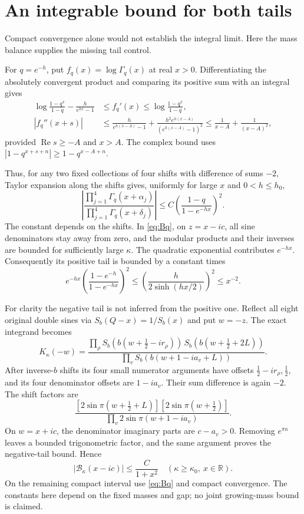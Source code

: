 \documentclass[11pt,a4paper]{article}
\begin{document}
\section{An integrable bound for both tails}
Compact convergence alone would not establish the integral limit.
Here the mass balance supplies the missing tail control.

For \(q=e^{-h}\), put \(f_q(x)=\log\Gamma_q(x)\) at real \(x>0\).
Differentiating the absolutely convergent product and comparing its
positive sum with an integral gives
\begin{align}
 \log\frac{1-q^x}{1-q}-\frac{h}{e^{hx}-1}
 &\le f_q'(x)\le\log\frac{1-q^x}{1-q},\\
 |f_q''(x+s)|
 &\le \frac{h}{e^{h(x-A)}-1}
       +\frac{h^2e^{h(x-A)}}{(e^{h(x-A)}-1)^2}
 \le\frac1{x-A}+\frac1{(x-A)^2},
 \label{eq:qbounds}
\end{align}
provided \(\operatorname{Re}s\ge-A\) and \(x>A\). The complex bound
uses \(|1-q^{x+s+n}|\ge1-q^{x-A+n}\).

Thus, for any two fixed collections of four shifts with difference of
sums \(-2\), Taylor expansion along the shifts gives, uniformly for
large \(x\) and \(0<h\le h_0\),
\begin{equation}
 \left|\frac{\prod_{j=1}^4\Gamma_q(x+\alpha_j)}
                  {\prod_{j=1}^4\Gamma_q(x+\delta_j)}\right|
 \le C\left(\frac{1-q}{1-e^{-hx}}\right)^2. \label{eq:qratio}
\end{equation}
The constant depends on the shifts. In \eqref{eq:Bq}, on
\(z=x-ic\), all sine denominators stay away from zero, and the modular
products and their inverses are bounded for sufficiently large
\(\kappa\). The quadratic exponential contributes \(e^{-hx}\).
Consequently its positive tail is bounded by a constant times
\[
 e^{-hx}\left(\frac{1-e^{-h}}{1-e^{-hx}}\right)^2
 \le\left(\frac{h}{2\sinh(hx/2)}\right)^2\le x^{-2}.
\]

For clarity the negative tail is not inferred from the positive one.
Reflect all eight original double sines via \(S_b(Q-x)=1/S_b(x)\)
and put \(w=-z\). The exact integrand becomes
\begin{equation}
 K_\kappa(-w)=
 \frac{\prod_\rho S_b(b(w+\frac12-ir_\rho))\,
       S_b(b(w+\frac12+2L))}
      {\prod_v S_b(b(w+1-ia_v+L))}. \label{eq:negative}
\end{equation}
After inverse-\(b\) shifts its four small numerator arguments have
offsets \(\frac12-ir_\rho,\frac12\), and its four denominator
offsets are \(1-ia_v\). Their sum difference is again \(-2\).
The shift factors are
\[
 \frac{[2\sin\pi(w+\frac12+L)][2\sin\pi(w+\frac12)]}
      {\prod_v2\sin\pi(w+1-ia_v)}.
\]
On \(w=x+ic\), the denominator imaginary parts are \(c-a_v>0\).
Removing \(e^{\pi\kappa}\) leaves a bounded trigonometric factor,
and the same argument proves the negative-tail bound. Hence
\begin{equation}
 |\mathcal B_\kappa(x-ic)|\le\frac{C}{1+x^2}
 \quad(\kappa\ge\kappa_0,\ x\in\mathbb R). \label{eq:dom}
\end{equation}
On the remaining compact interval use \eqref{eq:Bq} and compact
convergence. The constants here depend on the fixed masses and gap;
no joint growing-mass bound is claimed.
\end{document}
